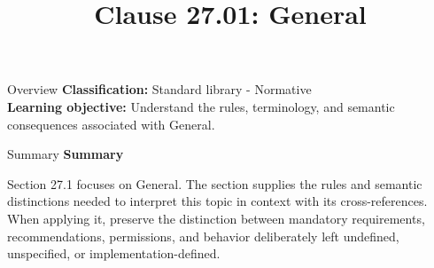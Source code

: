 \documentclass[10pt,letterpaper]{article}
\title{Clause 27.01: General}
\author{}
\date{}
\begin{document}
\maketitle
\begin{CornellOverviewBox}{Overview}
\textbf{Classification:} Standard library - Normative\\[2pt]
\textbf{Learning objective:} Understand the rules, terminology, and semantic consequences associated with General.
\end{CornellOverviewBox}\begin{CornellSummaryBox}{Summary}
{\sffamily\bfseries\color{Accent} Summary}\par\vspace{3pt}Section 27.1 focuses on General. The section supplies the rules and semantic distinctions needed to interpret this topic in context with its cross-references. When applying it, preserve the distinction between mandatory requirements, recommendations, permissions, and behavior deliberately left undefined, unspecified, or implementation-defined.
\end{CornellSummaryBox}
\end{document}
